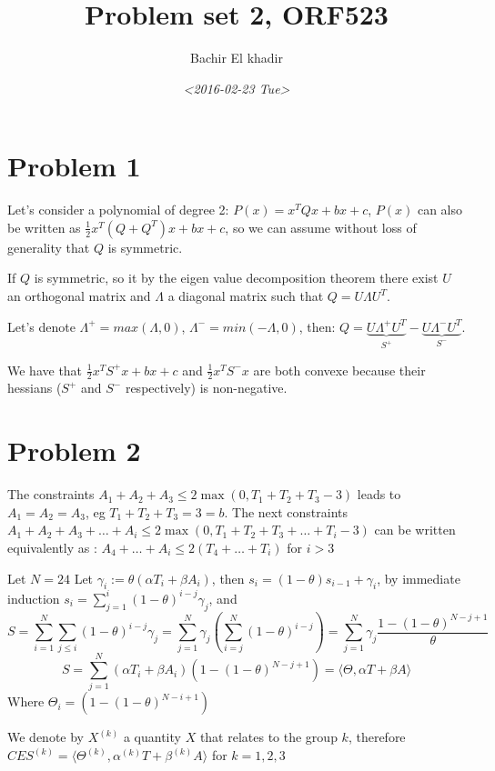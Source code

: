 \documentclass[11pt]{article}
\author{Bachir El khadir}
\date{\textit{<2016-02-23 Tue>}}
\title{Problem set 2, ORF523}
\begin{document}
\maketitle



\section{Problem 1}
\label{sec:orgheadline1}
Let's consider a polynomial of degree 2: \(P(x) = x^TQx + bx + c\), \(P(x)\) can also be written as \(\frac12 x^T(Q + Q^T)x + bx + c\), so we can assume without loss of generality that \(Q\) is symmetric.

If \(Q\) is symmetric, so it by the eigen value decomposition theorem there exist \(U\) an orthogonal matrix and \(\Lambda\) a diagonal matrix such that \(Q = U\Lambda U^T\).

Let's denote \(\Lambda^+ = max(\Lambda, 0)\), \(\Lambda^- = min(-\Lambda, 0)\), then: \(Q = \underbrace{U\Lambda^+ U^T}_{S^+} -  \underbrace{U\Lambda^- U^T}_{S^-}\).


We have that \(\frac12 x^TS^+x + bx + c\) and \(\frac12 x^TS^-x\) are both convexe because their hessians (\(S^+\) and \(S^-\) respectively) is non-negative.

\section{Problem 2}
\label{sec:orgheadline2}


The constraints \(A_1+A_2+A_3 \le 2 \max(0, T_1+T_2+T_3 - 3)\) leads to \(A_1 = A_2 = A_3\), eg \(T_1 + T_2 + T_3 = 3 = b\).
The next constraints \(A_1 + A_2 + A_3 + \ldots  + A_i \le 2\max(0, T_1 + T_2 + T_3 + \ldots + T_i- 3)\) can be written equivalently as : \(A_4 + \ldots + A_i \le 2(T_4 + \ldots + T_i)\) for \(i > 3\)


Let \(N = 24\)
Let \(\gamma_i := \theta(\alpha T_i + \beta A_i)\), then \(s_i = (1-\theta)s_{i-1} + \gamma_i\), by immediate induction \(s_i = \sum_{j=1}^i (1-\theta)^{i-j} \gamma_j\),
and $$S = \sum_{i=1}^{N} \sum_{j \le i} (1-\theta)^{i-j} \gamma_j = \sum_{j=1}^N \gamma_j (\sum_{i=j}^N(1-\theta)^{i-j}) = \sum_{j=1}^N \gamma_j \frac{1 - (1-\theta)^{N-j+1}}{\theta}  $$
$$S = \sum_{j=1}^N (\alpha T_i + \beta A_i) (1 - (1-\theta)^{N-j+1}) = \langle \Theta, \alpha T + \beta A \rangle  $$
Where \(\Theta_i = (1 - (1-\theta)^{N-i+1})\)

We denote by \(X^{(k)}\) a quantity \(X\) that relates to the group \(k\), therefore \(CES^{(k)} = \langle \Theta^{(k)}, \alpha^{(k)} T + \beta^{(k)} A \rangle\) for \(k = 1, 2, 3\)
\end{document}
